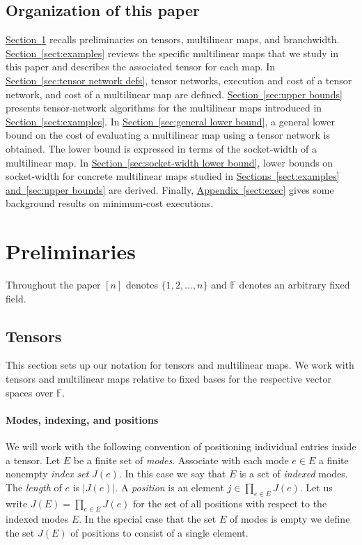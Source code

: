 \documentclass[11pt]{article}
\numberwithin{equation}{section}
\theoremstyle{definition}
\theoremstyle{plain}
\newcommand{\expref}[2]{\hyperref[#2]{#1~\ref{#2}}}
\newcommand{\F}{\ensuremath{\mathbb{F}}}
\begin{document}
\subsection{Organization of this paper}

\expref{Section}{sect:preliminaries} recalls preliminaries on tensors, multilinear maps, and branchwidth. \expref{Section}{sect:examples} reviews the specific multilinear maps that we study in this %
paper  %
and describes
the associated tensor for each map. In \expref{Section}{sec:tensor network defs}, tensor networks, execution and cost of a tensor network, and cost of a multilinear map are defined. \expref{Section}{sec:upper bounds} presents tensor-network algorithms for the multilinear maps introduced in \expref{Section}{sect:examples}. In \expref{Section}{sec:general lower bound}, a general lower bound on the cost of evaluating a multilinear map using
a  %
%
tensor network is obtained. The lower bound is expressed in terms of the socket-width of a multilinear map. In \expref{Section}{sec:socket-width lower bound}, lower bounds on socket-width for concrete multilinear maps studied in \expref{Sections}{sect:examples} \expref{and}{sec:upper bounds} are derived. Finally, \expref{Appendix}{sect:exec} gives some background results on minimum-cost executions.

\section{Preliminaries}
\label{sect:preliminaries}

Throughout the paper $[n]$ denotes $\{1,2,\ldots,n\}$ and $\F$ denotes
an arbitrary fixed field.

\subsection{Tensors}
\label{sect:tensors-maps}

This section sets up our notation for tensors and multilinear maps.
We work with tensors and multilinear maps relative to fixed bases for
the respective vector spaces over $\F$.

\paragraph*{Modes, indexing, and positions}

We will work with the following convention of positioning individual
entries inside a tensor.  Let $E$ be a finite set of 
\emph{modes}. Associate with each mode $e\in E$ a finite nonempty
\emph{index set} $J(e)$. In this case we say that $E$ is a set of
\emph{indexed} modes.  The \emph{length} of $e$ is $|J(e)|$. 
A \emph{position} is an element $j\in \prod_{e\in E}J(e)$. 
Let us write $J(E)=\prod_{e\in E}J(e)$ for the set of all
positions with respect to the indexed modes $E$.  In the special case
that the %
set $E$ of modes  %
is empty we define the
%
set $J(E)$ of positions  %
to consist of a single element.
\end{document}
